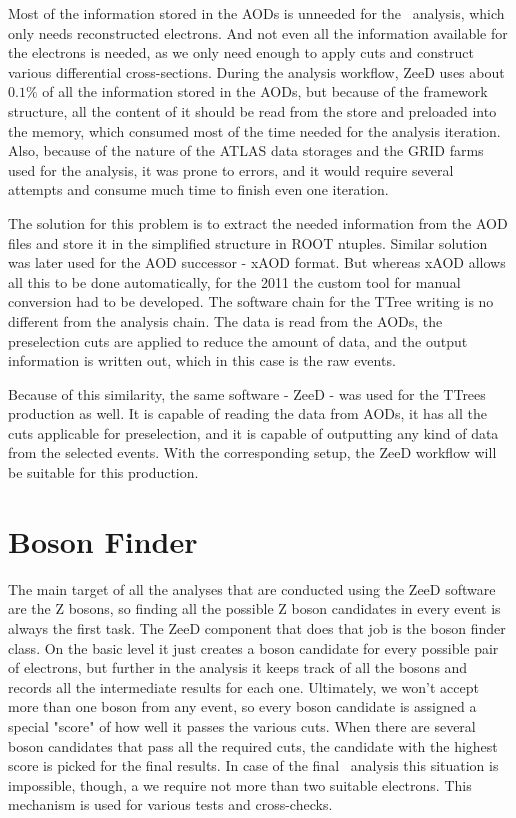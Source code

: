 Most of the information stored in the AODs is unneeded for the \Zee\ analysis, which only needs reconstructed electrons. And not even all the information available for the electrons is needed, as we only need enough to apply cuts and construct various differential cross-sections. During the analysis workflow, ZeeD uses about $0.1\%$ of all the information stored in the AODs, but because of the framework structure, all the content of it should be read from the store and preloaded into the memory, which consumed most of the time needed for the analysis iteration. Also, because of the nature of the ATLAS data storages and the GRID farms used for the analysis, it was prone to errors, and it would require several attempts and consume much time to finish even one iteration.

The solution for this problem is to extract the needed information from the AOD files and store it in the simplified structure in ROOT ntuples. Similar solution was later used for the AOD successor - xAOD format. But whereas xAOD allows all this to be done automatically, for the 2011 the custom tool for manual conversion had to be developed. The software chain for the TTree writing is no different from the analysis chain. The data is read from the AODs, the preselection cuts are applied to reduce the amount of data, and the output information is written out, which in this case is the raw events.

Because of this similarity, the same software - ZeeD - was used for the TTrees production as well. It is capable of reading the data from AODs, it has all the cuts applicable for preselection, and it is capable of outputting any kind of data from the selected events. With the corresponding setup, the ZeeD workflow will be suitable for this production.

\section{Boson Finder}

The main target of all the analyses that are conducted using the ZeeD software are the Z bosons, so finding all the possible Z boson candidates in every event is always the first task. The ZeeD component that does that job is the boson finder class. On the basic level it just creates a boson candidate for every possible pair of electrons, but further in the analysis it keeps track of all the bosons and records all the intermediate results for each one. Ultimately, we won't accept more than one boson from any event, so every boson candidate is assigned a special "score" of how well it passes the various cuts. When there are several boson candidates that pass all the required cuts, the candidate with the highest score is picked for the final results. In case of the final \Zee\ analysis this situation is impossible, though, a we require not more than two suitable electrons. This mechanism is used for various tests and cross-checks.

